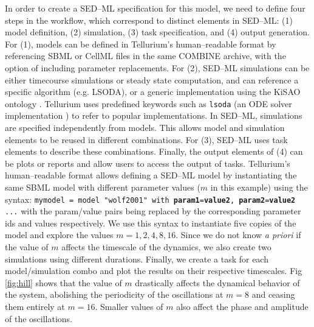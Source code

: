 \documentclass[10pt,letterpaper]{article}
\begin{document}
In order to create a SED--ML specification for this model, we need to define four steps in the workflow, which correspond to distinct elements in SED--ML: (1) model definition, (2) simulation, (3) task specification, and (4) output generation. For (1), models can be defined in Tellurium's human--readable format by referencing SBML or CellML files in the same COMBINE archive, with the option of including parameter replacements. For (2), SED--ML simulations can be either timecourse simulations or steady state computation, and can reference a specific algorithm (e.g. LSODA), or a generic implementation using the KiSAO ontology \cite{courtot2011controlled}. Tellurium uses predefined keywords such as \texttt{lsoda} (an ODE solver implementation \cite{petzold1997lsoda}) to refer to popular implementations. In SED--ML, simulations are specified independently from models. This allows model and simulation elements to be reused in different combinations. For (3), SED--ML uses task elements to describe these combinations. Finally, the output elements of (4) can be plots or reports and allow users to access the output of tasks. Tellurium's human--readable format allows defining a SED--ML model by instantiating the same SBML model with different parameter values ($m$ in this example) using the syntax:
\newline
\newline
\texttt{mymodel = model "wolf2001" with \textbf{param1}=\textbf{value2}, \textbf{param2}=\textbf{value2} ...}
\newline
\newline
with the param/value pairs being replaced by the corresponding parameter ids and values respectively. We use this syntax to instantiate five copies of the model and explore the values $m=1,2,4,8,16$. Since we do not know \textit{a priori} if the value of $m$ affects the timescale of the dynamics, we also create two simulations using different durations. Finally, we create a task for each model/simulation combo and plot the results on their respective timescales. Fig \ref{fig:hill} shows that the value of $m$ drastically affects the dynamical behavior of the system, abolishing the periodicity of the oscillations at $m=8$ and ceasing them entirely at $m=16$. Smaller values of $m$ also affect the phase and amplitude of the oscillations.
\end{document}
